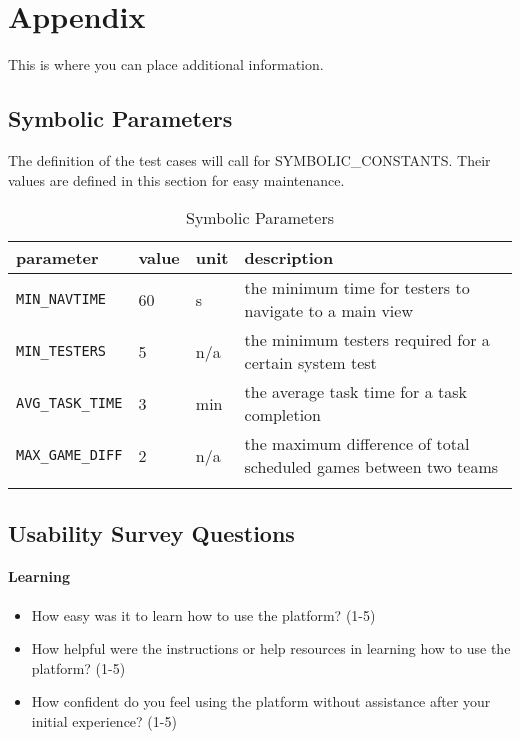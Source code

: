 \documentclass[12pt, titlepage]{article}
\begin{document}




\newpage

\section{Appendix}

This is where you can place additional information.

\subsection{Symbolic Parameters}

The definition of the test cases will call for SYMBOLIC\_CONSTANTS.
Their values are defined in this section for easy maintenance.
\begin{longtable}{|l|l|l|p{5cm}|}

    \hline
    parameter                                     & value & unit & description                                                       \\
    \hline
    \texttt{MIN\_NAVTIME}\label{MIN_NAVTIME}      & 60    & s    & the minimum time for testers to navigate to a main view           \\
    \hline
    \texttt{MIN\_TESTERS}\label{MIN_TESTERS}      & 5     & n/a  & the minimum testers required for a certain system test            \\
    \hline
    \texttt{AVG\_TASK\_TIME}\label{AVG_TASK_TIME} & 3     & min  & the average task time for a task completion                       \\
    \hline
    \texttt{MAX\_GAME\_DIFF}\label{MAX_GAME_DIFF} & 2     & n/a  & the maximum difference of total scheduled games between two teams \\
    \hline
	\caption{Symbolic Parameters}
\end{longtable}

\subsection{Usability Survey Questions}

\paragraph{Learning}
\begin{itemize}
    \item{How easy was it to learn how to use the platform? (1-5)}
    \item{How helpful were the instructions or help resources in learning how to use the platform? (1-5)}
    \item{How confident do you feel using the platform without assistance after your initial experience? (1-5)}
\end{itemize}
\end{document}

